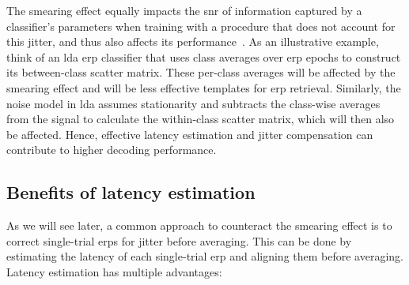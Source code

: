 The smearing effect equally impacts the \ac{snr} of information captured by a
classifier's parameters when training with a procedure that does not account for
this jitter, and thus also affects its performance~\cite{Thompson2012}.
As an illustrative example, think of an \ac{lda} \ac{erp} classifier that uses
class averages over \ac{erp} epochs to construct its between-class scatter
matrix.
These per-class averages will be affected by the smearing effect and will be
less effective templates for \ac{erp} retrieval.
Similarly, the noise model in \ac{lda} assumes stationarity and subtracts
the class-wise averages from the signal to calculate
the within-class scatter matrix, which will then also be affected.
Hence, effective latency estimation and jitter compensation can contribute to higher
decoding performance.

\subsection{Benefits of latency estimation}
As we will see later, a common approach to counteract the smearing effect is to correct single-trial
\acp{erp} for jitter before averaging.
This can be done by estimating the latency of each
single-trial \ac{erp} and aligning them before averaging.
Latency estimation has multiple advantages:
